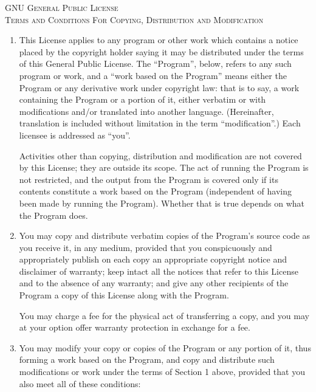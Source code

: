 \begin{center}
  \Large \scshape GNU General Public License \\
  \vspace{3mm} Terms and Conditions For Copying,
  Distribution and Modification
\end{center}

\begin{enumerate}  \addtocounter{enumi}{-1}

\item This License applies to any program or other work
  which contains a notice placed by the copyright holder
  saying it may be distributed under the terms of this
  General Public License.  The ``Program'', below, refers to
  any such program or work, and a ``work based on the
  Program'' means either the Program or any derivative work
  under copyright law: that is to say, a work containing the
  Program or a portion of it, either verbatim or with
  modifications and/or translated into another language.
  (Hereinafter, translation is included without limitation
  in the term ``modification''.)  Each licensee is addressed
  as ``you''.

  Activities other than copying, distribution and
  modification are not covered by this License; they are
  outside its scope.  The act of running the Program is not
  restricted, and the output from the Program is covered
  only if its contents constitute a work based on the
  Program (independent of having been made by running the
  Program).  Whether that is true depends on what the
  Program does.

\item You may copy and distribute verbatim copies of the
  Program's source code as you receive it, in any medium,
  provided that you conspicuously and appropriately publish
  on each copy an appropriate copyright notice and
  disclaimer of warranty; keep intact all the notices that
  refer to this License and to the absence of any warranty;
  and give any other recipients of the Program a copy of
  this License along with the Program.

  You may charge a fee for the physical act of transferring
  a copy, and you may at your option offer warranty
  protection in exchange for a fee.

\item You may modify your copy or copies of the Program or
  any portion of it, thus forming a work based on the
  Program, and copy and distribute such modifications or
  work under the terms of Section 1 above, provided that you
  also meet all of these conditions:


\end{enumerate}
